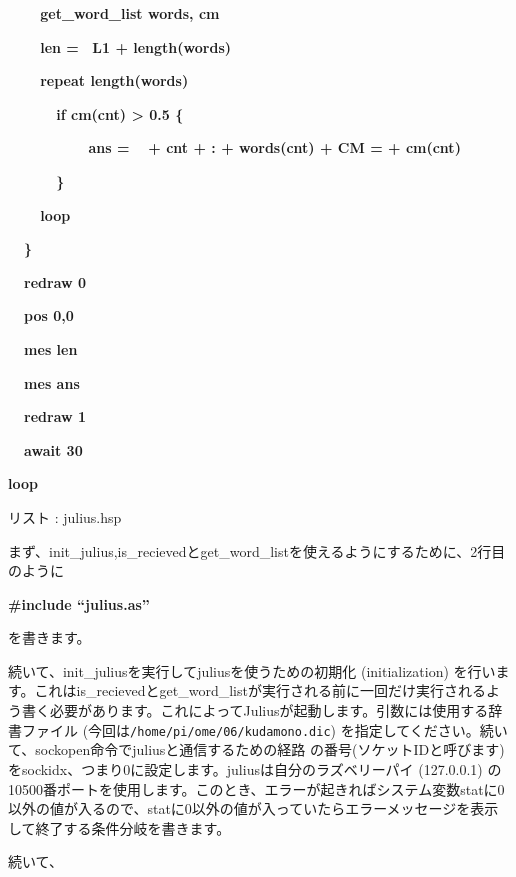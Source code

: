 \documentclass[a4paper,dvipdfmx]{jarticle}
\newcounter{List}
\renewcommand\theList{\arabic{List}}
\begin{document}
\begin{minipage}{17.006cm}
{\ttfamily\bfseries
\ \ \ \ get\_word\_list words, cm}

{\ttfamily\bfseries
\ \ \ \ len = \ {\textquotedbl}L1 {\textquotedbl} + length(words)}

{\ttfamily\bfseries
\ \ \ \ repeat length(words)}

{\ttfamily\bfseries
\ \ \ \ \ \ if cm(cnt) {\textgreater} 0.5 \{}

{\ttfamily\bfseries
\ \ \ \ \ \ \ \ \ \ ans = \ {\textquotedbl}{\textquotedbl} + cnt + {\textquotedbl}: {\textquotedbl} + words(cnt) +
{\textquotedbl} CM = {\textquotedbl} + cm(cnt)}

{\ttfamily\bfseries
\ \ \ \ \ \ \}}

{\ttfamily\bfseries
\ \ \ \ loop}

{\ttfamily\bfseries
\ \ \}}

{\ttfamily\bfseries
\ \ redraw 0}

{\ttfamily\bfseries
\ \ pos 0,0}

{\ttfamily\bfseries
\ \ mes len}

{\ttfamily\bfseries
\ \ mes ans}

{\ttfamily\bfseries
\ \ redraw 1}

{\ttfamily\bfseries
\ \ await 30}

{\ttfamily\bfseries
loop}

{\upshape
リスト \stepcounter{List}{\theList}: julius.hsp}
\end{minipage}
{
まず、init\_julius,is\_recievedとget\_word\_listを使えるようにするために、2行目のように}

{\ttfamily\bfseries
\#include ``julius.as{}''}

{
を書きます。}

{
続いて、init\_juliusを実行してjuliusを使うための初期化
(initialization)
を行います。これはis\_recievedとget\_word\_listが実行される前に一回だけ実行されるよう書く必要があります。これによってJuliusが起動します。引数には使用する辞書ファイル
(今回は\texttt{/home/pi/ome/06/kudamono.dic})
を指定してください。続いて、sockopen命令でjuliusと通信するための経路
の番号(ソケットIDと呼びます)
をsockidx、つまり0に設定します。juliusは自分のラズベリーパイ
(127.0.0.1)
の10500番ポートを使用します。このとき、エラーが起きればシステム変数statに0以外の値が入るので、statに0以外の値が入っていたらエラーメッセージを表示して終了する条件分岐を書きます。}

{
続いて、}
\end{document}
